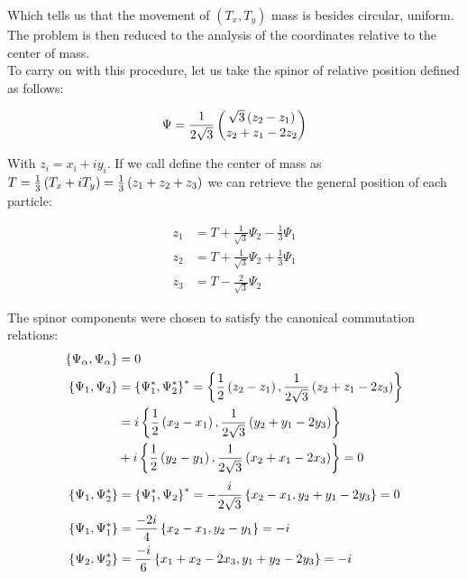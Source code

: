 Which tells us that the movement of $(T_x,T_y)$ mass is besides circular, uniform. The problem is then reduced to the analysis of the coordinates relative to the center of mass.\\

To carry on with this procedure, let us take the spinor of relative position defined as follows:

\begin{align}
\Psi = \frac{1}{2\sqrt{3}}\begin{pmatrix}\sqrt{3}\left( z_{2}-z_{1} \right)\\
z_{2}+z_{1}-2z_{2}\end{pmatrix}
\label{eq:spinor}
\end{align}

With $z_{i} = x_i + iy_i$. If we call define the center of mass as $T = \frac{1}{3}\left( T_x + iT_y \right) = \frac{1}{3}\left( z_1 +z_2+z_3 \right)$ we can retrieve the general position of each particle:

\small
\begin{equation}
\begin{aligned}
z_1 &= T+\frac{1}{\sqrt{3}}\Psi_2 - \frac{1}{3}\Psi_1 \\
z_2 &= T+\frac{1}{\sqrt{3}}\Psi_2 + \frac{1}{3}\Psi_1 \\
z_3 &= T-\frac{2}{\sqrt{3}}\Psi_2
\end{aligned}
\label{eq:singlevecs}
\end{equation}
\normalsize

The spinor components were chosen to satisfy the canonical commutation relations:
\begin{align*}
\left\lbrace \Psi_\alpha, \Psi_\alpha \right\rbrace &= 0\\
\left\lbrace \Psi_1, \Psi_2 \right\rbrace &= \left\lbrace \Psi_1^*, \Psi_2^* \right\rbrace^* = \left\lbrace \frac{1}{2}\left( z_{2}-z_{1} \right), \frac{1}{2\sqrt{3}}\left( z_{2}+z_{1}-2z_{3} \right) \right\rbrace \\
&= i\left\lbrace \frac{1}{2}\left( x_{2}-x_{1} \right), \frac{1}{2\sqrt{3}}\left( y_{2}+y_{1}-2y_{3} \right) \right\rbrace\\
&+ i\left\lbrace \frac{1}{2}\left( y_{2}-y_{1} \right), \frac{1}{2\sqrt{3}}\left( x_{2}+x_{1}-2x_{3} \right) \right\rbrace = 0\\
\end{align*}
\small
\begin{align*}
\left\lbrace \Psi_1, \Psi_2^* \right\rbrace &= \left\lbrace \Psi_1^*, \Psi_2 \right\rbrace^* = -\frac{i}{2\sqrt{3}}\left\lbrace x_{2}-x_{1}, y_{2}+y_{1}-2y_{3} \right\rbrace = 0\\
\left\lbrace \Psi_1, \Psi_1^* \right\rbrace &= \frac{-2i}{4}\left\lbrace x_{2}-x_{1}, y_2-y_1 \right\rbrace = -i\\
\left\lbrace \Psi_2, \Psi_2^* \right\rbrace &= \frac{-i}{6}\left\lbrace x_{1}+x_{2}-2x_3, y_1+y_2-2y_3 \right\rbrace = -i
\end{align*}
\normalsize

